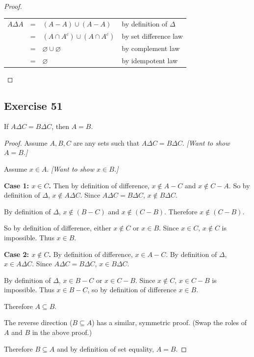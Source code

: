 \documentclass[14pt]{extarticle}
\newcommand{\es}{\varnothing}
\newcommand{\cy}{\color{cyan}}
\begin{document}
\begin{proof}
\begin{center}
\begin{tabular}{rcll}
\(A \Delta A\) & = & \((A - A) \cup (A - A)\) & {\cy by definition of $\Delta$} \\
& = & \((A \cap A^c) \cup (A \cap A^c)\) & {\cy by set difference law} \\
& = & \(\es \cup \es\) & {\cy by complement law} \\
& = & \(\es\) & {\cy by idempotent law}
\end{tabular}
\end{center}
\end{proof}

\subsection{Exercise 51}
If \(A \Delta C = B \Delta C\), then $A = B$.

\begin{proof}
Assume $A,B,C$ are any sets such that \(A \Delta C = B \Delta C\). {\it [Want to show $A = B$.]}

Assume $x \in A$. {\it [Want to show $x \in B$.]} 

{\bf Case 1: $x \in C$.} Then by definition of difference, \(x \notin A-C\) and \(x \notin C-A\). So by definition of 
$\Delta$, \(x \notin A \Delta C\). Since \(A \Delta C = B \Delta C\), \(x \notin B \Delta C\). 

By definition of $\Delta$, \(x \notin (B - C)\) and \(x \notin (C - B)\). Therefore \(x \notin (C - B)\). 

So by definition of difference, either \(x \notin C\) or \(x \in B\). Since \(x\in C\), \(x \notin C\) is impossible.
Thus \(x \in B\).

{\bf Case 2: $x \notin C$.} By definition of difference, \(x\in A-C\). By definition of $\Delta$, \(x\in A\Delta C\).
Since \(A \Delta C = B \Delta C\), \(x \in B \Delta C\).

By definition of $\Delta$, \(x \in B-C\) or \(x \in C-B\). Since \(x \notin C\), \(x \in C-B\) is impossible. Thus
\(x \in B-C\), so by definition of difference \(x \in B\).

Therefore \(A \subseteq B\).

The reverse direction (\(B \subseteq A\)) has a similar, symmetric proof. (Swap the roles of $A$ and $B$ in the 
above proof.)

Therefore \(B \subseteq A\) and by definition of set equality, $A = B$.
\end{proof}
\end{document}

